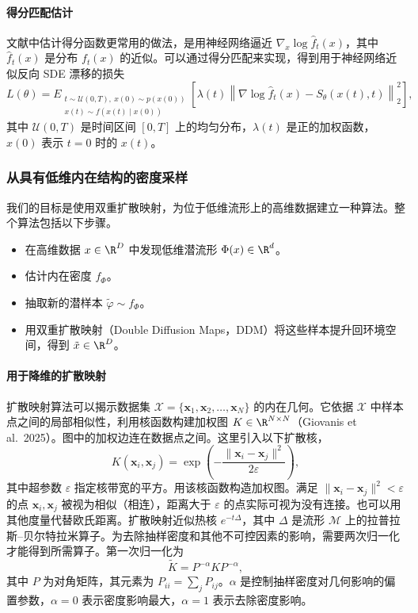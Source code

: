 \paragraph{得分匹配估计}

文献中估计得分函数更常用的做法，是用神经网络逼近 $\nabla_x\log\hat f_t(x)$，其中 $\hat f_t(x)$ 是分布 $f_t(x)$ 的近似。可以通过得分匹配来实现，得到用于神经网络近似反向 SDE 漂移的损失
\[
  L(\theta)=E_{\substack{t\sim\mathcal U(0,T),\ x(0)\sim p(x(0))\\
                      x(t)\sim f(x(t)\mid x(0))}}
  \left[\lambda(t)\left\|\nabla\log\hat f_t(x)-S_\theta(x(t),t)\right\|_2^2\right],
\]
其中 $\mathcal U(0,T)$ 是时间区间 $[0,T]$ 上的均匀分布，$\lambda(t)$ 是正的加权函数，$x(0)$ 表示 $t=0$ 时的 $x(t)$。

\subsubsection{从具有低维内在结构的密度采样}

我们的目标是使用双重扩散映射，为位于低维流形上的高维数据建立一种算法。整个算法包括以下步骤。
\begin{itemize}
  \item 在高维数据 $x\in\R^D$ 中发现低维潜流形 $\Phi(x)\in\R^d$。
  \item 估计内在密度 $f_\Phi$。
  \item 抽取新的潜样本 $\tilde\varphi\sim f_\Phi$。
  \item 用双重扩散映射（Double Diffusion Maps，DDM）将这些样本提升回环境空间，得到 $\tilde x\in\R^D$。
\end{itemize}

\paragraph{用于降维的扩散映射}

扩散映射算法可以揭示数据集 $\mathcal X=\{\boldsymbol x_1,\boldsymbol x_2,\ldots,\boldsymbol x_N\}$ 的内在几何。它依据 $\mathcal X$ 中样本点之间的局部相似性，利用核函数构建加权图 $K\in\R^{N\times N}$（Giovanis et al.\ 2025）。图中的加权边连在数据点之间。这里引入以下扩散核，
\[
  K(\boldsymbol x_i,\boldsymbol x_j)
    =\exp\left(-\frac{\lVert\boldsymbol x_i-\boldsymbol x_j\rVert^2}{2\varepsilon}\right),
\]
其中超参数 $\varepsilon$ 指定核带宽的平方。用该核函数构造加权图。满足 $\lVert\boldsymbol x_i-\boldsymbol x_j\rVert^2<\varepsilon$ 的点 $\boldsymbol x_i,\boldsymbol x_j$ 被视为相似（相连），距离大于 $\varepsilon$ 的点实际可视为没有连接。也可以用其他度量代替欧氏距离。扩散映射近似热核 $e^{-t\Delta}$，其中 $\Delta$ 是流形 $\mathcal M$ 上的拉普拉斯–贝尔特拉米算子。为去除抽样密度和其他不可控因素的影响，需要两次归一化才能得到所需算子。第一次归一化为
\[
  \tilde K=P^{-\alpha}KP^{-\alpha},
\]
其中 $P$ 为对角矩阵，其元素为 $P_{ii}=\sum_j P_{ij}$。$\alpha$ 是控制抽样密度对几何影响的偏置参数，$\alpha=0$ 表示密度影响最大，$\alpha=1$ 表示去除密度影响。

